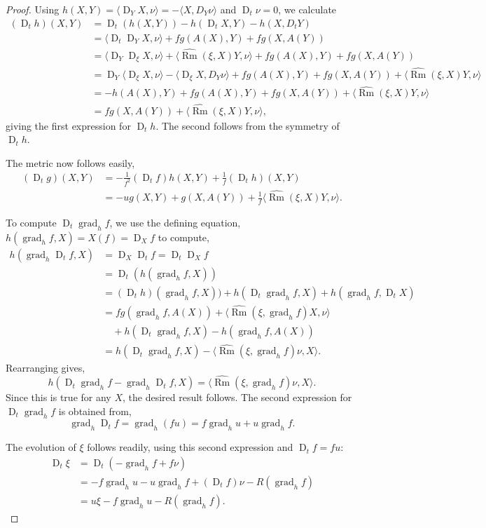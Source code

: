 \documentclass{amsart}
\theoremstyle{definition}
\theoremstyle{remark}
\newcommand{\ip}[2]{\ensuremath{\langle{#1},{#2}\rangle}}
\DeclareMathOperator{\grad}{grad}
\DeclareMathOperator{\Rm}{Rm}
\DeclareMathOperator{\D}{D}
\numberwithin{equation}{section}
\begin{document}
\begin{proof}
Using $h(X,Y) = \ip{\D_Y X}{\nu} = -\ip{X}{D_Y \nu}$ and $\D_t\nu = 0$, we calculate
\[
\begin{split}
(\D_t h) (X, Y) &= \D_t (h(X, Y)) - h(\D_t X, Y) - h(X, D_t Y) \\
&= \ip{\D_t \D_Y X}{\nu} + f g(A(X), Y) + f g(X, A(Y)) \\
&= \ip{\D_Y \D_{\xi} X}{\nu} + \ip{\widehat{\Rm}(\xi, X) Y}{\nu} + f g(A(X), Y) + f g(X, A(Y))\\
&= \D_Y \ip{\D_{\xi} X}{\nu} - \ip{\D_{\xi} X}{D_Y \nu} + f g(A(X), Y) + f g(X, A(Y)) + \ip{\widehat{\Rm}(\xi, X) Y}{\nu} \\
&= - h(A(X), Y) + f g(A(X), Y) + f g(X, A(Y)) + \ip{\widehat{\Rm}(\xi, X) Y}{\nu} \\
&= fg(X, A(Y)) + \ip{\widehat{\Rm}(\xi, X) Y}{\nu},
\end{split}
\]
giving the first expression for $\D_t h$. The second follows from the symmetry of $\D_t h$.

The metric now follows easily,
\[
\begin{split}
(\D_t g) (X, Y) &= -\frac{1}{f^2} (\D_t f) h(X, Y) + \frac{1}{f} (\D_t h) (X, Y) \\
&= -u g(X, Y) + g(X, A(Y)) + \frac{1}{f} \ip{\widehat{\Rm}(\xi, X) Y}{\nu}.
\end{split}
\]

To compute $\D_t \grad_h f$, we use the defining equation, $h(\grad_h f, X) = X(f) = \D_X f$ to compute,
\[
\begin{split}
h(\grad_h \D_t f, X) &= \D_X \D_t f = \D_t \D_X f \\
&=  \D_t (h(\grad_h f, X)) \\
&= (\D_t h) (\grad_h f, X)) + h(\D_t \grad_h f, X) + h(\grad_h f, \D_t X) \\
&= fg (\grad_h f, A(X)) + \ip{\widehat{\Rm}(\xi, \grad_h f)X}{\nu} \\
&\quad + h(\D_t \grad_h f, X) - h(\grad_h f, A(X)) \\
&= h(\D_t \grad_h f, X) - \ip{\widehat{\Rm}(\xi, \grad_h f)\nu}{X}.
\end{split}
\]
Rearranging gives,
\[
h(\D_t \grad_h f - \grad_h \D_t f, X) = \ip{\widehat{\Rm}(\xi, \grad_h f) \nu}{X}.
\]
Since this is true for any $X$, the desired result follows. The second expression for $\D_t \grad_h f$ is obtained from,
\[
\grad_h \D_t f = \grad_h (f u) = f \grad_h u + u \grad_h f.
\]

The evolution of $\xi$ follows readily, using this second expression and $\D_t f = f u$:
\[
\begin{split}
\D_t \xi &= \D_t (-\grad_h f + f \nu) \\
& = -f \grad_h u - u \grad_h f + (\D_t f) \nu - R(\grad_h f) \\
&= u\xi - f\grad_h u - R(\grad_h f).
\end{split}
\]


\end{proof}
\end{document}
